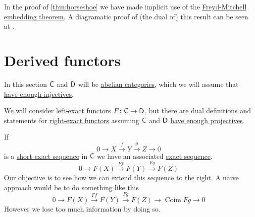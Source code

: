 \documentclass[../../main]{subfiles}
\begin{document}
\begin{remark}
  In the proof of \autoref{thm:horseshoe} we have made implicit use of the \hyperref[thm:freyd-mitchell]{Freyd-Mitchell embedding theorem}.
  A diagramatic proof of (the dual of) this result can be seen at \cite[Lemma 2.8.8]{weibelIntroductionHomologicalAlgebra1994}.
\end{remark}

\section{Derived functors}
In this section \(\mathsf{C}\) and \(\mathsf{D}\) will be \hyperref[def:abelian-category]{abelian categories}, which we will assume that \hyperref[def:enough-injectives-projectives]{have enough injectives}.

We will consider \hyperref[def:exact-functor]{left-exact functors} \(F\colon \mathsf{C} \to \mathsf{D}\), but there are dual definitions and statements for \hyperref[def:exact-functor]{right-exact functors} assuming \(\mathsf{C}\) and \(\mathsf{D}\) \hyperref[def:enough-injectives-projectives]{have enough projectives}.

If
\begin{equation*}
  0 \to X \xrightarrow{f} Y \xrightarrow{g} Z \to 0
\end{equation*}
is a \hyperref[def:exact-sequence]{short exact sequence} in \(\mathsf{C}\) we have an associated \hyperref[def:exact-sequence]{exact sequence}.
\begin{equation*}
  0 \to F(X) \xrightarrow{Ff} F(Y) \xrightarrow{Fg} F(Z)
\end{equation*}
Our objective is to see how we can extend this sequence to the right.
A naive approach would be to do something like this
\begin{equation*}
  0 \to F(X) \xrightarrow{Ff} F(Y) \xrightarrow{Fg} F(Z) \to \operatorname{Coim} Fg \to 0
\end{equation*}
However we lose too much information by doing so.
\end{document}

